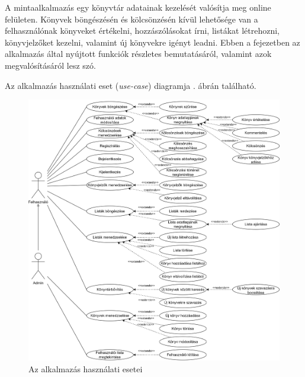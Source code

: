 

A mintaalkalmazás egy könyvtár adatainak kezelését valósítja meg online felületen. Könyvek böngészésén és kölcsönzésén kívül lehetősége van a felhasználónak könyveket értékelni, hozzászólásokat írni, listákat létrehozni, könyvjelzőket kezelni, valamint új könyvekre igényt leadni. Ebben a fejezetben az alkalmazás által nyújtott funkciók részletes bemutatásáról, valamint azok megvalósításáról lesz szó.



Az alkalmazás használati eset (\textit{use-case}) diagramja . ábrán található.

\begin{figure}[h]
	\centering
	\includegraphics[scale=0.6]{images/graphlibrary-usecase-better.png}
	\caption{Az alkalmazás használati esetei}
	\label{fig:use-case}
\end{figure}

